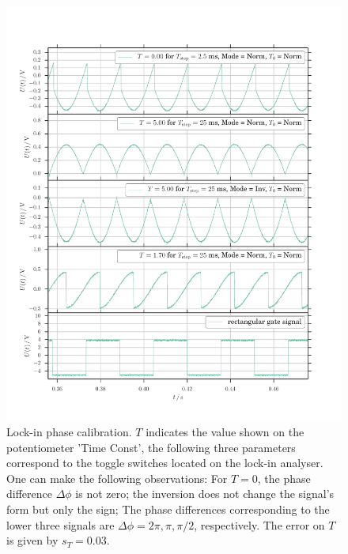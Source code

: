 \begin{figure}
	\includegraphics[width=\textwidth]{figures/phase.pdf}
	\caption{
		Lock-in phase calibration.
		$T$ indicates the value shown on the potentiometer 'Time Const', 
		the following three parameters correspond to the toggle switches located on the lock-in analyser.
		One can make the following observations: For $T = 0$, the phase difference $\Delta \phi$ is not zero;
		the inversion does not change the signal's form but only the sign; The phase differences corresponding 
		to the lower three signals are $\Delta \phi = 2\pi, \pi, \pi / 2$, respectively.
		The error on $T$ is given by $s_T = 0.03$.
		}
	\label{fig:phase}
\end{figure}

